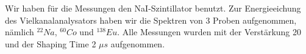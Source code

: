 Wir haben für die Messungen den NaI-Szintillator benutzt. Zur Energieeichung des Vielkanalanalysators haben wir die Spektren von 3 Proben aufgenommen, nämlich $^{22}Na$, $^{60}Co$ und $^{138}Eu$. Alle Messungen wurden mit der Verstärkung 20 und der Shaping Time 2 $\mu s$ aufgenommen.




























